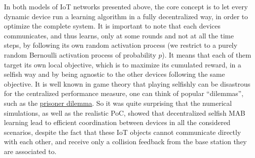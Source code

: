 %
In both models of IoT networks presented above, the core concept is to let every dynamic device run a learning algorithm in a fully decentralized way, in order to optimize the complete system.
It is important to note that each devices communicates, and thus learns, only at some rounds and not at all the time steps, by following its own random activation process (we restrict to a purely random Bernoulli activation process of probability $p$).
It means that each of them target its own local objective, which is to maximize its cumulated reward, in a selfish way and by being agnostic to the other devices following the same objective.
It is well known in game theory that playing selfishly can be disastrous for the centralized performance measure, one can think of popular ``dilemmas'', such as the \href{https://en.wikipedia.org/wiki/Prisoner%27s_dilemma}{prisoner dilemma}.
So it was quite surprising that the numerical simulations, as well as the realistic PoC, showed that decentralized selfish MAB learning lead to efficient coordination between devices in all the considered scenarios, despite the fact that these IoT objects cannot communicate directly with each other, and receive only a collision feedback from the base station they are associated to.

